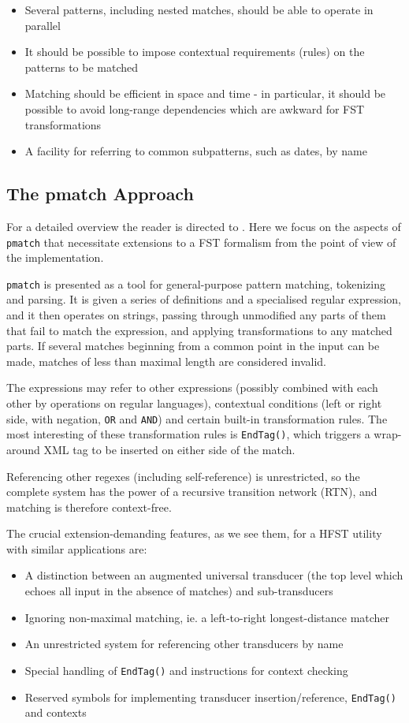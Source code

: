 \documentclass{llncs}
\begin{document}
\begin{itemize}
\item Several patterns, including nested matches,
should be able to operate in parallel
\item It should be possible to impose contextual requirements (rules) on
the patterns to be matched
\item Matching should be efficient in space and time - in particular, it should
be possible to avoid long-range
dependencies which are awkward for FST transformations
\item A facility for referring to common subpatterns, such as dates, by name
\end{itemize}

\subsection{The pmatch Approach}

For a detailed overview the reader is directed to \cite{karttunen2011}.
Here we focus on the aspects of \verb!pmatch! that necessitate extensions
to a FST formalism from the point of view of the implementation.

\verb!pmatch! is presented as a tool for general-purpose pattern matching,
tokenizing and parsing. It is given a series of definitions and a
specialised regular expression, and it then operates on strings, passing
through unmodified any parts of them that fail to match the expression,
and applying transformations to any matched parts. If several matches beginning
from a common point in the input can be made, matches of less than maximal
length are considered invalid.

The expressions may refer to other expressions (possibly combined with each
other by operations on regular languages), contextual conditions
(left or right side, with negation, \verb!OR! and \verb!AND!) and certain
built-in transformation rules. The most interesting of these transformation
rules is \verb!EndTag()!, which triggers a wrap-around XML tag to be inserted
on either side of the match.

Referencing other regexes (including self-reference) is unrestricted, so
the complete system has the power of a recursive transition network (RTN),
and matching is therefore context-free.

The crucial extension-demanding features, as we see them, for a HFST utility
with similar applications are:

\begin{itemize}
\item A distinction between an augmented universal transducer (the top level
which echoes all input in the absence of matches) and sub-transducers
\item Ignoring non-maximal matching, ie. a left-to-right longest-distance
matcher
\item An unrestricted system for referencing other transducers by name
\item Special handling of \verb!EndTag()! and instructions for context
checking
\item Reserved symbols for implementing transducer insertion/reference,
\verb!EndTag()! and contexts
\end{itemize}
\end{document}
